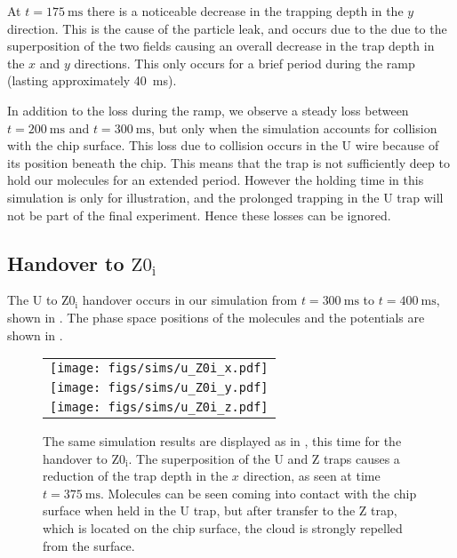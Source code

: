 At $t=\SI{175}{\milli\second}$ there is a noticeable decrease in the trapping
depth in the $y$ direction. This is the cause of the particle leak, and occurs
due to the due to the superposition of the two fields causing an overall
decrease in the trap depth in the $x$ and $y$ directions. This only occurs for
a brief period during the ramp (lasting approximately \SI{40}{\milli\second}). 

In addition to the loss during the ramp, we observe a steady loss between
$t=\SI{200}{\milli\second}$ and $t=\SI{300}{\milli\second}$, but only when the
simulation accounts for collision with the chip surface. This loss due to
collision occurs in the U wire because of its position beneath the chip. This
means that the trap is not sufficiently deep to hold our molecules for an
extended period. However the holding time in this simulation is only for
illustration, and the prolonged trapping in the U trap will not be part of the
final experiment. Hence these losses can be ignored.

\subsection{Handover to $\mathrm{Z0_i}$}
\label{design:sim:U_to_Z0i}

The U to $\mathrm{Z0_i}$ handover occurs in our simulation from
$t=\SI{300}{\milli\second}$ to $t=\SI{400}{\milli\second}$, shown in
.  The phase space positions of the
molecules and the potentials are shown in .

\begin{figure}[p]
\centering
  \begin{tabular}{c}
    \texttt{[image: figs/sims/u\_Z0i\_x.pdf]} \\
    \texttt{[image: figs/sims/u\_Z0i\_y.pdf]} \\
    \texttt{[image: figs/sims/u\_Z0i\_z.pdf]}
  \end{tabular}
  \caption{
    The same simulation results are displayed as in
    , this time for the handover to $\mathrm{Z0_i}$.
    The superposition of the U and Z traps causes a reduction of the trap depth
    in the $x$ direction, as seen at time $t=\SI{375}{\milli\second}$.
    Molecules can be seen coming into contact with the chip surface when held
    in the U trap, but after transfer to the Z trap, which is located on the
    chip surface, the cloud is strongly repelled from the surface.
  }
  \label{design:fig:U_Z0i}
\end{figure}

